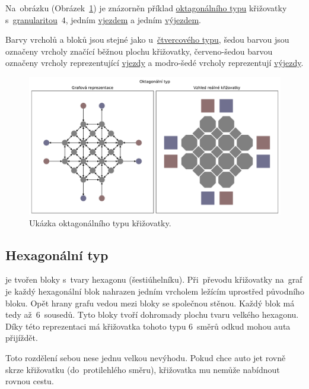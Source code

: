Na~obrázku (Obrázek~\ref{fig:octagonal_type_graph}) je znázorněn příklad
\hyperref[subsec:oktagonali_typ]{oktagonálního typu} křižovatky s~\hyperref[par:granularita]{granularitou}~$4$,
jedním \hyperref[par:vjezdy]{vjezdem} a jedním \hyperref[par:vyjezdy]{výjezdem}.

Barvy vrcholů a bloků jsou stejné jako u~\hyperref[subsec:ctvercovy_typ]{čtvercového typu},
šedou barvou jsou označeny vrcholy značící běžnou plochu křižovatky,
červeno-šedou barvou označeny vrcholy reprezentující \hyperref[par:vjezdy]{vjezdy} a
modro-šedé vrcholy reprezentují \hyperref[par:vyjezdy]{výjezdy}.

\begin{figure}[h]
	\centering
	\includegraphics[width=\textwidth]{../img/Octagonal_grid}
	\caption{Ukázka oktagonálního typu křižovatky.}
	\label{fig:octagonal_type_graph}
\end{figure}

\subsection{Hexagonální typ}\label{subsec:hexagonalni_typ}

 je tvořen bloky s~tvary hexagonu (šestiúhelníku).
Při~převodu křižovatky na~graf je každý hexagonální blok nahrazen jedním vrcholem ležícím uprostřed původního bloku.
Opět hrany grafu vedou mezi bloky se společnou stěnou.
Každý blok má tedy až~$6$~sousedů.
Tyto bloky tvoří dohromady plochu tvaru velkého hexagonu.
Díky této reprezentaci má křižovatka tohoto typu $6$~směrů odkud mohou auta přijíždět.

Toto rozdělení sebou nese jednu velkou nevýhodu.
Pokud chce auto jet rovně skrze křižovatku (do~protilehlého směru), křižovatka mu nemůže nabídnout rovnou cestu.

